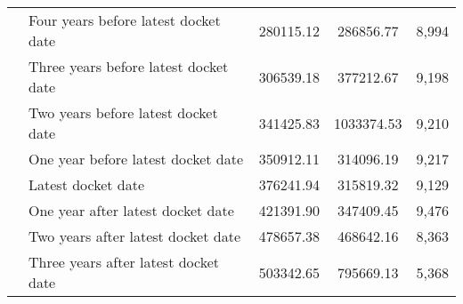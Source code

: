 \begin{tabular}{llccc}
 & Four years before latest docket date & 280115.12 & 286856.77 & 8,994 \\
 & Three years before latest docket date & 306539.18 & 377212.67 & 9,198 \\
 & Two years before latest docket date & 341425.83 & 1033374.53 & 9,210 \\
 & One year before latest docket date & 350912.11 & 314096.19 & 9,217 \\
 & Latest docket date & 376241.94 & 315819.32 & 9,129 \\
 & One year after latest docket date & 421391.90 & 347409.45 & 9,476 \\
 & Two years after latest docket date & 478657.38 & 468642.16 & 8,363 \\
 & Three years after latest docket date & 503342.65 & 795669.13 & 5,368 \\
\cline{1-5}
\bottomrule
\end{tabular}
